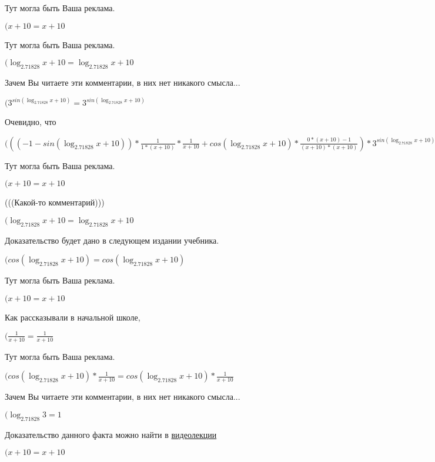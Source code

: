 \documentclass[12pt,a4paper,fleqn]{article}
\theoremstyle{definition}
\begin{document}
Тут могла быть Ваша реклама.

$( x  +  10  =  x  +  10 $

Тут могла быть Ваша реклама.

$(\log_{ 2.71828 }{ x  +  10 } = \log_{ 2.71828 }{ x  +  10 }$

Зачем Вы читаете эти комментарии, в них нет никакого смысла...

$({ 3 }^{sin(\log_{ 2.71828 }{ x  +  10 })} = { 3 }^{sin(\log_{ 2.71828 }{ x  +  10 })}$

Очевидно, что

$((( -1  - sin(\log_{ 2.71828 }{ x  +  10 })) * \frac{ 1 }{ 1  * ( x  +  10 )}
 * \frac{ 1 }{ x  +  10 }
 + cos(\log_{ 2.71828 }{ x  +  10 }) * \frac{ 0  * ( x  +  10 ) -  1 }{( x  +  10 ) * ( x  +  10 )}
) * { 3 }^{sin(\log_{ 2.71828 }{ x  +  10 })} = (( -1  - sin(\log_{ 2.71828 }{ x  +  10 })) * \frac{ 1 }{ 1  * ( x  +  10 )}
 * \frac{ 1 }{ x  +  10 }
 + cos(\log_{ 2.71828 }{ x  +  10 }) * \frac{ 0  * ( x  +  10 ) -  1 }{( x  +  10 ) * ( x  +  10 )}
) * { 3 }^{sin(\log_{ 2.71828 }{ x  +  10 })}$

Тут могла быть Ваша реклама.

$( x  +  10  =  x  +  10 $

(((Какой-то комментарий)))

$(\log_{ 2.71828 }{ x  +  10 } = \log_{ 2.71828 }{ x  +  10 }$

Доказательство будет дано в следующем издании учебника.

$(cos(\log_{ 2.71828 }{ x  +  10 }) = cos(\log_{ 2.71828 }{ x  +  10 })$

Тут могла быть Ваша реклама.

$( x  +  10  =  x  +  10 $

Как рассказывали в начальной школе,

$(\frac{ 1 }{ x  +  10 }
 = \frac{ 1 }{ x  +  10 }
$

Тут могла быть Ваша реклама.

$(cos(\log_{ 2.71828 }{ x  +  10 }) * \frac{ 1 }{ x  +  10 }
 = cos(\log_{ 2.71828 }{ x  +  10 }) * \frac{ 1 }{ x  +  10 }
$

Зачем Вы читаете эти комментарии, в них нет никакого смысла...

$(\log_{ 2.71828 }{ 3 } =  1 $

Доказательство данного факта можно найти в \href{https://www.youtube.com/watch?v=dQw4w9WgXcQ}{видеолекции}

$( x  +  10  =  x  +  10 $
\end{document}
